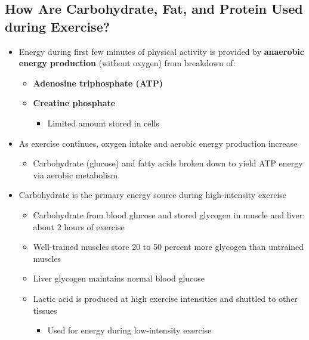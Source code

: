 \documentclass[12pt]{article}
\begin{document}
        \subsection{How Are Carbohydrate, Fat, and Protein Used during Exercise?}
            \begin{itemize}
                \item Energy during first few minutes of physical activity is provided by \textbf{anaerobic energy production} (without oxygen) from breakdown of:
                    \begin{itemize}
                        \item \textbf{Adenosine triphosphate (ATP)}
                        \item \textbf{Creatine phosphate}
                            \begin{itemize}
                                \item Limited amount stored in cells
                            \end{itemize}
                    \end{itemize}
                \item As exercise continues, oxygen intake and aerobic energy production increase
                    \begin{itemize}
                        \item Carbohydrate (glucose) and fatty acids broken down to yield ATP energy via aerobic metabolism
                    \end{itemize}
                \item Carbohydrate is the primary energy source during high-intensity exercise
                    \begin{itemize}
                        \item Carbohydrate from blood glucose and stored glycogen in muscle and liver: about 2 hours of exercise
                        \item Well-trained muscles store 20 to 50 percent more glycogen than untrained muscles
                        \item Liver glycogen maintains normal blood glucose
                        \item Lactic acid is produced at high exercise intensities and shuttled to other tissues
                            \begin{itemize}
                                \item Used for energy during low-intensity exercise

\end{itemize}
\end{itemize}
\end{itemize}
\end{document}
